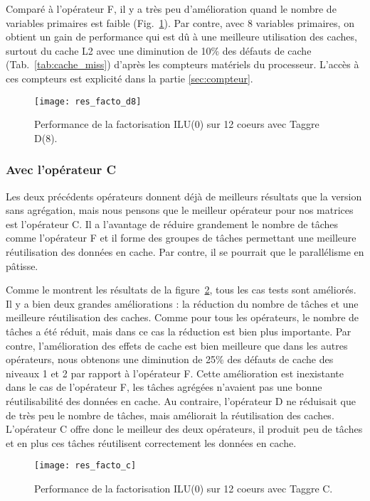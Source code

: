 Comparé à l'opérateur F, il y a très peu d'amélioration quand le nombre de variables primaires est faible (Fig.~\ref{fig:res_facto_d8}).
%
Par contre, avec 8 variables primaires, on obtient un gain de performance qui est dû à une meilleure utilisation des caches, surtout du cache L2 avec une diminution de 10\% des défauts de cache (Tab.~\ref{tab:cache_miss}) d'après les compteurs matériels du processeur.
%
L'accès à ces compteurs est explicité dans la partie \ref{sec:compteur}.


\begin{figure}[!h]
  \centering
  \texttt{[image: res\_facto\_d8]}
  \caption{Performance de la factorisation ILU(0) sur 12 coeurs avec Taggre D(8).}
  \label{fig:res_facto_d8}
\end{figure}


\subsubsection{Avec l'opérateur C}
Les deux précédents opérateurs donnent déjà de meilleurs résultats que la version sans agrégation, mais nous pensons que le meilleur opérateur pour nos matrices est l'opérateur C.
%
Il a l'avantage de réduire grandement le nombre de tâches comme l'opérateur F et il forme des groupes de tâches permettant une meilleure réutilisation des données en cache.
%
Par contre, il se pourrait que le parallélisme en pâtisse.


Comme le montrent les résultats de la figure~\ref{fig:res_facto_c}, tous les cas tests sont améliorés.
%
Il y a bien deux grandes améliorations : la réduction du nombre de tâches et une meilleure réutilisation des caches.
%
Comme pour tous les opérateurs, le nombre de tâches a été réduit, mais dans ce cas la réduction est bien plus importante.
%
Par contre, l'amélioration des effets de cache est bien meilleure que dans les autres opérateurs, nous obtenons une diminution de 25\% des défauts de cache des niveaux 1 et 2 par rapport à l'opérateur F.
%
Cette amélioration est inexistante dans le cas de l'opérateur F, les tâches agrégées n'avaient pas une bonne réutilisabilité des données en cache.
%
Au contraire, l'opérateur D ne réduisait que de très peu le nombre de tâches, mais améliorait la réutilisation des caches.
%
L'opérateur C offre donc le meilleur des deux opérateurs, il produit peu de tâches et en plus ces tâches réutilisent correctement les données en cache.

\begin{figure}[!h]
  \centering
  \texttt{[image: res\_facto\_c]}
  \caption{Performance de la factorisation ILU(0) sur 12 coeurs avec Taggre C.}
  \label{fig:res_facto_c}
\end{figure}

